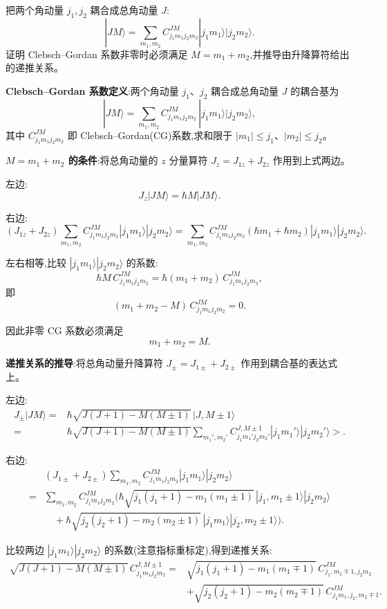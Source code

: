 \begin{question}
把两个角动量 $j_1,j_2$ 耦合成总角动量 $J$:
\[
|JM\rangle=\sum_{m_1,m_2} C^{JM}_{j_1m_1j_2m_2}|j_1m_1\rangle|j_2m_2\rangle.
\]
证明 Clebsch--Gordan 系数非零时必须满足 $M=m_1+m_2$,并推导由升降算符给出的递推关系。
\begin{solution}
	\textbf{Clebsch--Gordan 系数定义}:两个角动量 $j_1$、$j_2$ 耦合成总角动量 $J$ 的耦合基为
	\[
	|JM\rangle = \sum_{m_1,m_2} C^{JM}_{j_1m_1j_2m_2}\,|j_1m_1\rangle|j_2m_2\rangle,
	\]
	其中 $C^{JM}_{j_1m_1j_2m_2}$ 即 Clebsch--Gordan(CG)系数,求和限于 $|m_1|\le j_1$、$|m_2|\le j_2$。

	\textbf{$M=m_1+m_2$ 的条件}:将总角动量的 $z$ 分量算符 $J_z = J_{1z}+J_{2z}$ 作用到上式两边。

	左边:
	\[
	J_z|JM\rangle = \hbar M|JM\rangle.
	\]

	右边:
	\[
	(J_{1z}+J_{2z})\sum_{m_1,m_2}C^{JM}_{j_1m_1j_2m_2}|j_1m_1\rangle|j_2m_2\rangle
	= \sum_{m_1,m_2}C^{JM}_{j_1m_1j_2m_2}(\hbar m_1+\hbar m_2)|j_1m_1\rangle|j_2m_2\rangle.
	\]

	左右相等,比较 $|j_1m_1\rangle|j_2m_2\rangle$ 的系数:
	\[
	\hbar M\,C^{JM}_{j_1m_1j_2m_2} = \hbar(m_1+m_2)\,C^{JM}_{j_1m_1j_2m_2},
	\]
	即
	\[
	(m_1+m_2-M)\,C^{JM}_{j_1m_1j_2m_2}=0.
	\]

	因此非零 CG 系数必须满足
	\[
	\boxed{m_1+m_2 = M}.
	\]

	\textbf{递推关系的推导}:将总角动量升降算符 $J_\pm = J_{1\pm}+J_{2\pm}$ 作用到耦合基的表达式上。

	左边:
	\[
	\begin{aligned}
	J_\pm|JM\rangle={}&\hbar\sqrt{J(J+1)-M(M\pm1)}\,|J,M\pm1\rangle\\
	={}&\hbar\sqrt{J(J+1)-M(M\pm1)}\sum_{m_1',m_2'} C^{J,M\pm1}_{j_1m_1'j_2m_2'}|j_1m_1'\rangle|j_2m_2'\rangle>.
	\end{aligned}
	\]

	右边:
	\[
	\begin{aligned}
	&(J_{1\pm}+J_{2\pm})\sum_{m_1,m_2}C^{JM}_{j_1m_1j_2m_2}|j_1m_1\rangle|j_2m_2\rangle\\
	={}&\sum_{m_1,m_2}C^{JM}_{j_1m_1j_2m_2}\Big(
	\hbar\sqrt{j_1(j_1+1)-m_1(m_1\pm1)}\,|j_1,m_1\pm1\rangle|j_2m_2\rangle\\
	&\quad+\hbar\sqrt{j_2(j_2+1)-m_2(m_2\pm1)}\,|j_1m_1\rangle|j_2,m_2\pm1\rangle\Big).
	\end{aligned}
	\]

	比较两边 $|j_1m_1\rangle|j_2m_2\rangle$ 的系数(注意指标重标定),得到递推关系:
	\[
	\begin{aligned}
	\sqrt{J(J+1)-M(M\pm1)}\,C^{J,M\pm1}_{j_1m_1j_2m_2}={}&
	\sqrt{j_1(j_1+1)-m_1(m_1\mp1)}\,C^{JM}_{j_1,m_1\mp1,j_2m_2}\\
	&+\sqrt{j_2(j_2+1)-m_2(m_2\mp1)}\,C^{JM}_{j_1m_1,j_2,m_2\mp1}.
	\end{aligned}
	\]


\end{solution}
\end{question}
